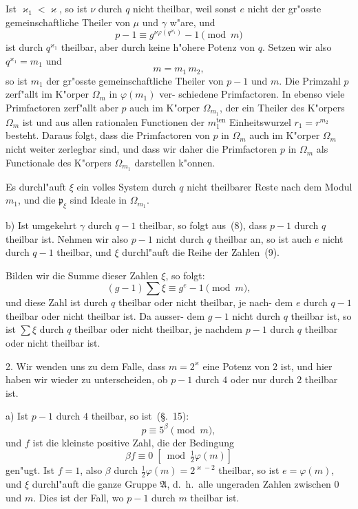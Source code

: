 \documentclass[12pt,a4paper]{article}
\theoremstyle{weber}
\begin{document}
Ist $\varkappa_1 < \varkappa$, so ist $\nu$ durch $q$ nicht theilbar, weil sonst $e$ nicht
der gr"osste gemeinschaftliche Theiler von $\mu$ und $\gamma$ w"are, und
\[
p - 1 \equiv g^{\nu\varphi(q^{\varkappa_1})} - 1 \pmod{m}
\]
ist durch $q^{\varkappa_1}$ theilbar, aber durch keine h"ohere Potenz von $q$.
Setzen wir also $q^{\varkappa_1} = m_1$ und
\begin{equation}\label{eq:s172-10}
m = m_1\,m_2,
\end{equation}
so ist $m_1$ der gr"osste gemeinschaftliche Theiler von $p - 1$
und $m$. Die Primzahl $p$ zerf"allt im K"orper $\varOmega_m$ in $\varphi(m_1)$ ver-
schiedene Primfactoren. In ebenso viele Primfactoren zerf"allt
aber $p$ auch im K"orper $\varOmega_{m_1}$, der ein Theiler des K"orpers $\varOmega_m$
ist und aus allen rationalen Functionen der $m_1^{\mathrm{ten}}$ Einheitswurzel
$r_1 = r^{m_2}$ besteht. Daraus folgt, dass die Primfactoren von $p$ in $\varOmega_m$
auch im K"orper $\varOmega_m$ nicht weiter zerlegbar sind, und dass wir
daher die Primfactoren $p$ in $\varOmega_m$ als Functionale des K"orpers
$\varOmega_{m_1}$ darstellen k"onnen.

Es durchl"auft $\xi$ ein volles System durch $q$ nicht theilbarer
Reste nach dem Modul $m_1$, und die $\mathfrak{p}_\xi$ sind Ideale in $\varOmega_{m_1}$.

\newpage
b) Ist umgekehrt $\gamma$ durch $q - 1$ theilbar, so folgt aus~(8),
dass $p - 1$ durch $q$ theilbar ist. Nehmen wir also $p - 1$ nicht
durch $q$ theilbar an, so ist auch $e$ nicht durch $q - 1$ theilbar,
und $\xi$ durchl"auft die Reihe der Zahlen~(9).

Bilden wir die Summe dieser Zahlen $\xi$, so folgt:
\[
(g - 1)\sum\xi \equiv g^e - 1 \pmod{m},
\]
und diese Zahl ist durch $q$ theilbar oder nicht theilbar, je nach-
dem $e$ durch $q - 1$ theilbar oder nicht theilbar ist. Da ausser-
dem $g - 1$ nicht durch $q$ theilbar ist, so ist $\sum\xi$ durch $q$ theilbar
oder nicht theilbar, je nachdem $p - 1$ durch $q$ theilbar oder
nicht theilbar ist.

2. Wir wenden uns zu dem Falle, dass $m = 2^\varkappa$ eine Potenz
von $2$ ist, und hier haben wir wieder zu unterscheiden, ob $p - 1$
durch $4$ oder nur durch $2$ theilbar ist.

a) Ist $p - 1$ durch $4$ theilbar, so ist~(\S.~15):
\[
p \equiv 5^\beta \pmod{m},
\]
und $f$ ist die kleinste positive Zahl, die der Bedingung
\[
\beta f \equiv 0 \;\left[\bmod \tfrac{1}{2}\varphi(m)\right]
\]
gen"ugt. Ist $f = 1$, also $\beta$ durch $\tfrac{1}{2}\varphi(m) = 2^{\varkappa-2}$ theilbar, so
ist $e = \varphi(m)$, und $\xi$ durchl"auft die ganze Gruppe $\mathfrak{A}$, d.~h.\ alle
ungeraden Zahlen zwischen $0$ und $m$. Dies ist der Fall, wo
$p - 1$ durch $m$ theilbar ist.
\end{document}
